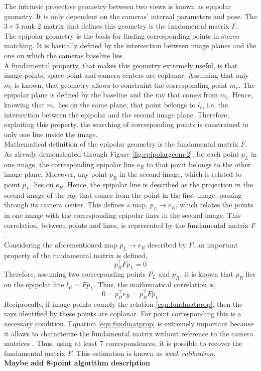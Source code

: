 The intrinsic projective geometry between two views is known as epipolar geometry.
It is only dependent on the cameras' internal parameters and pose.
The $3 \times 3$ rank 2 matrix that defines this geometry is the fundamental matrix $F$.\\
The epipolar geometry is the basis for finding corresponding points in stereo matching. 
It is basically defined by the intersection between image planes and the one on which the cameras baseline lies.\\
A fundamental property, that makes this geometry extremely useful, is that image points, space point and camera centers are coplanar. 
Assuming that only $m_l$ is known, that geometry allows to constraint the corresponding point $m_r$. 
The epipolar plane is defined by the baseline and the ray that comes from $m_l$. 
Hence, knowing that $m_r$ lies on the same plane, that point belongs to $l_r$, i.e. the intersection between the epipolar and the second image plane. 
Therefore, exploiting this property, the searching of corresponding points is constrained to only one line inside the image.\\
Mathematical definition of the epipolar geometry is the fundamental matrix $F$.
As already demonstrated through Figure \ref{fig:epipolargeom-2}, for each point $p_L$ in one image, the corresponding epipolar line $e_R$ to that point belongs to the other image plane. 
Moreover, any point $p_R$ in the second image, which is related to point $p_L$, lies on $e_R$.
Hence, the epipolar line is described as the projection in the second image of the ray that comes from the point in the first image, passing through its camera center.
This defines a map, $p_L \rightarrow e_R$, which relates the points in one image with the corresponding epipolar lines in the second image.
This correlation, between points and lines, is represented by the fundamental matrix $F$.\\
Considering the aforementioned map $p_L \rightarrow e_R$ described by $F$, an important property of the fundamental matrix is defined,
\begin{equation}\label{eqn:fundmatprop}
	p_R^\top F p_L = 0
\end{equation}
Therefore, assuming two corresponding points $P_L$ and $p_R$, it is known that $p_R$ lies on the epipolar line $l_R = F p_L$. 
Thus, the mathematical correlation is,
\begin{equation}
	0 = p_R^\top e_R = p_R^\top F p_L
\end{equation}
Reciprocally, if image points comply the relation \ref{eqn:fundmatprop}, then the rays identified by these points are coplanar. 
For point corresponding this is a necessary condition.
Equation \ref{eqn:fundmatprop} is extremely important because it allows to characterize the fundamental matrix without reference to the camera matrices \cite{hartley2004multiple}.
Thus, using at least 7 correspondences, it is possible to recover the fundamental matrix $F$. 
This estimation is known as \textit{weak calibration}.\\
\textbf{Maybe add 8-point algorithm description}

